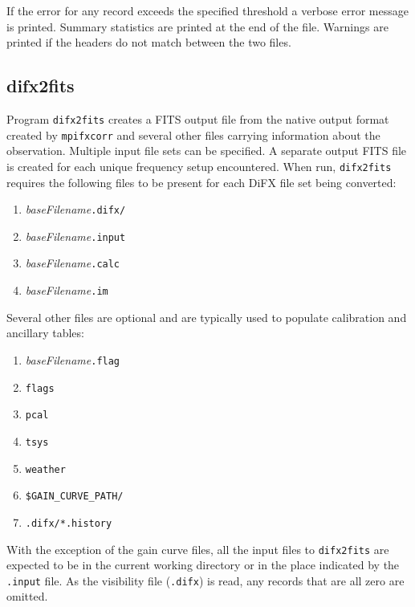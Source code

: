 \noindent 
If the error for any record exceeds the specified threshold a verbose error message is printed.
Summary statistics are printed at the end of the file.
Warnings are printed if the headers do not match between the two files.





\subsection{difx2fits} \label{sec:difx2fits}

Program {\tt difx2fits} creates a FITS output file from the native output format created by {\tt mpifxcorr} and several other files carrying information about the observation.
Multiple input file sets can be specified.
A separate output FITS file is created for each unique frequency setup encountered.
When run, {\tt difx2fits} requires the following files to be present for each DiFX file set being converted:
\begin{enumerate}
\item {\em baseFilename}{\tt .difx/}
\item {\em baseFilename}{\tt .input}
\item {\em baseFilename}{\tt .calc}
\item {\em baseFilename}{\tt .im}
\end{enumerate}
Several other files are optional and are typically used to populate calibration and ancillary tables:
\begin{enumerate}
\item {\em baseFilename}{\tt .flag} 
\item {\tt flags}
\item {\tt pcal}
\item {\tt tsys}
\item {\tt weather}
\item {\tt \$GAIN\_CURVE\_PATH/}
\item {\tt .difx/*.history}
\end{enumerate}
With the exception of the gain curve files, all the input files to {\tt difx2fits} are expected to be in the current working directory or in the place indicated by the {\tt .input} file.
As the visibility file ({\tt .difx}) is read, any records that are all zero are omitted.

